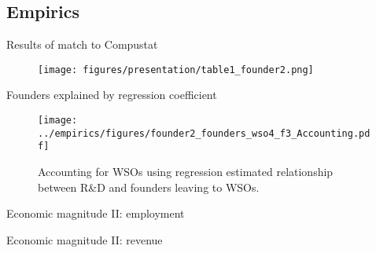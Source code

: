 \documentclass[english,usenames,dvipsnames]{beamer}
\begin{document}
\subsection{Empirics}


\begin{frame}{Results of match to Compustat}\label{results_of_match}
	\hyperlink{economic_magnitude}{}
	\begin{figure}
		\texttt{[image: figures/presentation/table1\_founder2.png]}
	\end{figure}
\end{frame}

\begin{frame}{Founders explained by regression coefficient}\label{regs_economic_significance}
	\hyperlink{economic_magnitude}{}
	\begin{figure}[!htb]
		\texttt{[image: ../empirics/figures/founder2\_founders\_wso4\_f3\_Accounting.pdf]}
		\caption{\small Accounting for WSOs using regression estimated relationship between R\&D and founders leaving to WSOs.}
	\end{figure}
\end{frame}


\begin{frame}{Economic magnitude II: employment}\label{regs_startup_lifecycle_employment}
	\hyperlink{economic_magnitude}{}
	\begin{table}[!htb]
		\Tiny
		\centering
		
		\caption{\footnotesize Dependent variable is logarithm of employee count divided by number of founders. Indepdendent variable is fraction of founders whose previous employer was in the same industry.} 
		\label{table:startupLifeCycle_founder2founders_lemployeecount_founder2}
	\end{table}
\end{frame}


\begin{frame}{Economic magnitude II: revenue}\label{regs_startup_lifecycle_revenue}
	\hyperlink{economic_magnitude}{}
	\begin{table}[!htb]
		\Tiny
		\centering
		
		\caption{\footnotesize Dependent variable is logarithm of revenue divided by number of founders. Indepdendent variable is fraction of founders whose previous employer was in the same industry.} 
		\label{table:startupLifeCycle_founder2founders_lrevenue_founder2}
	\end{table}
\end{frame}
\end{document}
